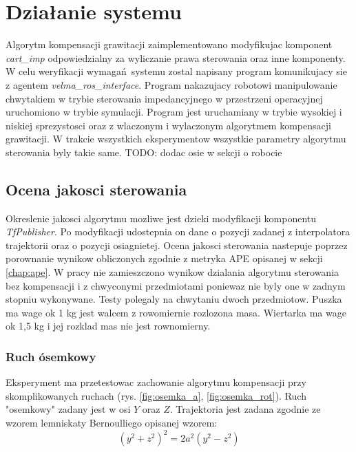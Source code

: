 
\chapter{Działanie systemu\label{chap:weryfikacja_systemu}}
\graphicspath{{../../velma/przerobione_testy/out/}{./images}}

Algorytm kompensacji grawitacji zaimplementowano modyfikujac komponent \textit{cart\_imp} odpowiedzialny za wyliczanie prawa sterowania oraz inne komponenty. W celu weryfikacji wymagań systemu zostal napisany program komunikujacy sie z agentem \textit{velma\_ros\_interface}. Program  nakazujacy robotowi manipulowanie chwytakiem w trybie sterowania impedancyjnego w przestrzeni operacyjnej uruchomiono w trybie symulacji. Program jest uruchamiany w trybie wysokiej i niskiej sprezystosci oraz z wlaczonym i wylaczonym algorytmem kompensacji grawitacji. W trakcie wszystkich eksperymentow wszystkie parametry algorytmu sterowania byly takie same. TODO: dodac osie w sekcji o robocie 

\section{Ocena jakosci sterowania}
Okreslenie jakosci algorytmu mozliwe jest dzieki modyfikacji komponentu \textit{TfPublisher}. Po modyfikacji udostepnia on dane o pozycji zadanej z interpolatora trajektorii oraz o pozycji osiagnietej. Ocena jakosci sterowania nastepuje poprzez porownanie wynikow obliczonych zgodnie z metryka APE opisanej w sekcji \ref{chap:ape}. W pracy nie zamieszczono wynikow dzialania algorytmu sterowania bez kompensacji i z chwyconymi przedmiotami poniewaz nie byly one w zadnym stopniu wykonywane. Testy polegaly na chwytaniu dwoch przedmiotow. Puszka ma wage ok 1 kg jest walcem z rowomiernie rozlozona masa. Wiertarka ma wage ok 1,5 kg i jej rozklad mas nie jest rownomierny.


\subsection{Ruch ósemkowy}

Eksperyment ma przetestowac zachowanie algorytmu kompensacji przy skomplikowanych ruchach (rys. \ref{fig:osemka_a}, \ref{fig:osemka_rot}).  Ruch "osemkowy" zadany jest w osi $Y$ oraz $Z$.
Trajektoria jest zadana zgodnie ze wzorem lemniskaty Bernoulliego opisanej wzorem:
\begin{equation}
(y^2 + z^2)^2 = 2a^2(y^2-z^2)
\end{equation}


